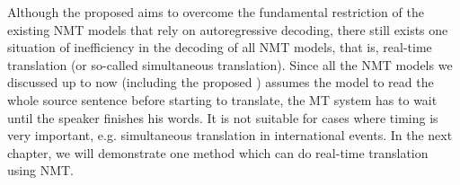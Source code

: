 Although the proposed \model{} aims to overcome the fundamental restriction of the existing NMT models that rely on autoregressive decoding,
there still exists one situation of inefficiency in the decoding of all NMT models, that is,  real-time translation (or so-called simultaneous translation).
Since all the NMT models we discussed up to now (including the proposed \model{}) assumes the model to read the whole source sentence before starting to translate,  the MT system has to wait until the speaker finishes his words.
It is not suitable for cases where timing is very important, e.g. simultaneous translation in international events. In the next chapter, we will demonstrate one method which can do real-time translation using NMT.


  